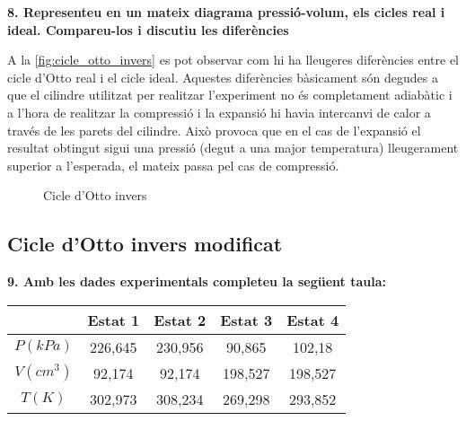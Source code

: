 \documentclass[a4paper]{article}
\begin{document}
\textbf{8. Representeu en un mateix diagrama pressió-volum, els cicles real i ideal. Compareu-los i discutiu les diferències}

A la \autoref{fig:cicle_otto_invers} es pot observar com hi ha lleugeres diferències entre el cicle d'Otto real i el cicle ideal. Aquestes diferències bàsicament són degudes a que el cilindre utilitzat per realitzar l'experiment no és completament adiabàtic i a l'hora de realitzar la compressió i la expansió hi havia intercanvi de calor a través de les parets del cilindre. Això provoca que en el cas de l'expansió el resultat obtingut sigui una pressió (degut a una major temperatura) lleugerament superior a l'esperada, el mateix passa pel cas de compressió.

\begin{figure}[H]
    \centering
    \caption{Cicle d'Otto invers}
    \label{fig:cicle_otto_invers}
\end{figure}

\subsection*{Cicle d'Otto invers modificat}

\textbf{9. Amb les dades experimentals completeu la següent taula:}

\begin{tabular}{c|cccc}
    & Estat 1 & Estat 2 & Estat 3 & Estat 4 \\
    \hline
    $P(kPa)$ & 226,645 & 230,956 & 90,865 & 102,18 \\
    $V(cm^3)$ & 92,174 & 92,174 & 198,527 & 198,527 \\
    $T(K)$ & 302,973 & 308,234 & 269,298 & 293,852 \\
\end{tabular}
\end{document}
